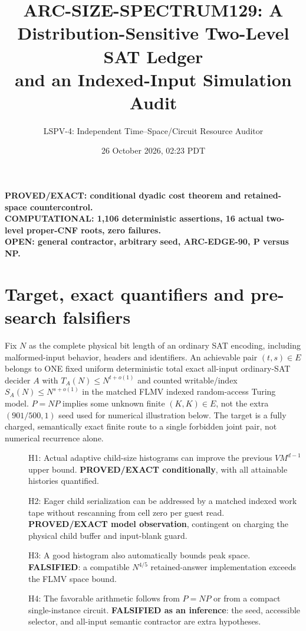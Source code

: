 \documentclass[11pt]{article}
\title{ARC-SIZE-SPECTRUM129: A Distribution-Sensitive Two-Level SAT Ledger\\and an Indexed-Input Simulation Audit}
\author{LSPV-4: Independent Time--Space/Circuit Resource Auditor}
\date{26 October 2026, 02:23 PDT}
\begin{document}
\maketitle
\begin{center}
\textbf{PROVED/EXACT: conditional dyadic cost theorem and retained-space countercontrol.}\\
\textbf{COMPUTATIONAL: 1,106 deterministic assertions, 16 actual two-level proper-CNF roots, zero failures.}\\
\textbf{OPEN: general contractor, arbitrary seed, ARC-EDGE-90, P versus NP.}
\end{center}
\section{Target, exact quantifiers and pre-search falsifiers}
Fix $N$ as the complete physical bit length of an ordinary SAT encoding, including malformed-input behavior, headers and identifiers. An achievable pair $(t,s)\in E$ belongs to ONE fixed uniform deterministic total exact all-input ordinary-SAT decider $A$ with $T_A(N)\le N^{t+o(1)}$ and counted writable/index $S_A(N)\le N^{s+o(1)}$ in the matched FLMV indexed random-access Turing model. $P=NP$ implies some unknown finite $(K,K)\in E$, not the extra $(901/500,1)$ seed used for numerical illustration below. The target is a fully charged, semantically exact finite route to a single forbidden joint pair, not numerical recurrence alone.
\begin{description}
\item[] H1: Actual adaptive child-size histograms can improve the previous $VM^{d-1}$ upper bound. \textbf{PROVED/EXACT conditionally}, with all attainable histories quantified.
\item[] H2: Eager child serialization can be addressed by a matched indexed work tape without rescanning from cell zero per guest read. \textbf{PROVED/EXACT model observation}, contingent on charging the physical child buffer and input-blank guard.
\item[] H3: A good histogram also automatically bounds peak space. \textbf{FALSIFIED}: a compatible $N^{4/5}$ retained-answer implementation exceeds the FLMV space bound.
\item[] H4: The favorable arithmetic follows from $P=NP$ or from a compact single-instance circuit. \textbf{FALSIFIED as an inference}: the seed, accessible selector, and all-input semantic contractor are extra hypotheses.
\end{description}
\end{document}
